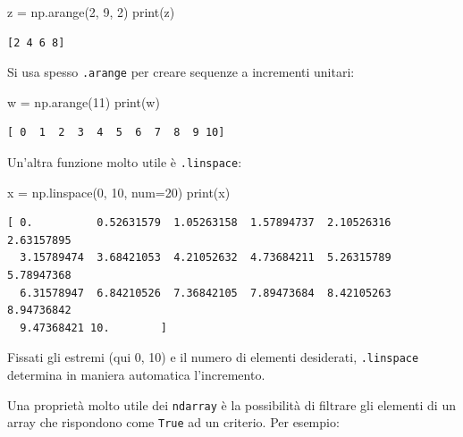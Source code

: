 \documentclass[
  letterpaper,
  krantz2]{{[}./krantz{]}}
\newenvironment{Shaded}{\begin{snugshade}}{\end{snugshade}}
\newcommand{\BuiltInTok}[1]{\textcolor[rgb]{0.00,0.23,0.31}{#1}}
\newcommand{\DecValTok}[1]{\textcolor[rgb]{0.68,0.00,0.00}{#1}}
\newcommand{\NormalTok}[1]{\textcolor[rgb]{0.00,0.23,0.31}{#1}}
\newcommand{\OperatorTok}[1]{\textcolor[rgb]{0.37,0.37,0.37}{#1}}
\begin{document}
\begin{Shaded}
\begin{Highlighting}[]
\NormalTok{z }\OperatorTok{=}\NormalTok{ np.arange(}\DecValTok{2}\NormalTok{, }\DecValTok{9}\NormalTok{, }\DecValTok{2}\NormalTok{)}
\BuiltInTok{print}\NormalTok{(z)}
\end{Highlighting}
\end{Shaded}

\begin{verbatim}
[2 4 6 8]
\end{verbatim}

Si usa spesso \texttt{.arange} per creare sequenze a incrementi unitari:

\begin{Shaded}
\begin{Highlighting}[]
\NormalTok{w }\OperatorTok{=}\NormalTok{ np.arange(}\DecValTok{11}\NormalTok{)}
\BuiltInTok{print}\NormalTok{(w)}
\end{Highlighting}
\end{Shaded}

\begin{verbatim}
[ 0  1  2  3  4  5  6  7  8  9 10]
\end{verbatim}

Un'altra funzione molto utile è \texttt{.linspace}:

\begin{Shaded}
\begin{Highlighting}[]
\NormalTok{x }\OperatorTok{=}\NormalTok{ np.linspace(}\DecValTok{0}\NormalTok{, }\DecValTok{10}\NormalTok{, num}\OperatorTok{=}\DecValTok{20}\NormalTok{)}
\BuiltInTok{print}\NormalTok{(x)}
\end{Highlighting}
\end{Shaded}

\begin{verbatim}
[ 0.          0.52631579  1.05263158  1.57894737  2.10526316  2.63157895
  3.15789474  3.68421053  4.21052632  4.73684211  5.26315789  5.78947368
  6.31578947  6.84210526  7.36842105  7.89473684  8.42105263  8.94736842
  9.47368421 10.        ]
\end{verbatim}

Fissati gli estremi (qui 0, 10) e il numero di elementi desiderati,
\texttt{.linspace} determina in maniera automatica l'incremento.

Una proprietà molto utile dei \texttt{ndarray} è la possibilità di
filtrare gli elementi di un array che rispondono come \texttt{True} ad
un criterio. Per esempio:
\end{document}
